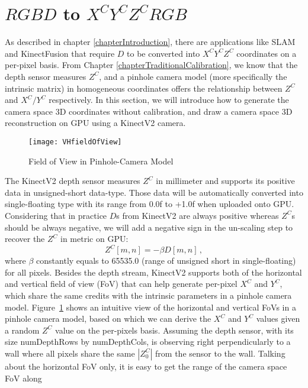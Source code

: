 \section{\(RGBD\) to \(X^CY^CZ^CRGB\)}
\label{sectionCameraSpaceReconstruction}
As described in chapter \ref{chapterIntroduction}, there are applications like SLAM and KinectFusion that require \(D\) to be converted into \(X^CY^CZ^C\) coordinates on a per-pixel basis. From Chapter \ref{chapterTraditionalCalibration}, we know that the depth sensor measures \(Z^C\), and a pinhole camera model (more specifically the intrinsic matrix) in homogeneous coordinates offers the relationship between \(Z^C\) and \(X^C/Y^C\) respectively. In this section, we will introduce how to generate the camera space 3D coordinates without calibration, and draw a camera space 3D reconstruction on GPU using a KinectV2 camera.
\\\indent
%
\begin{figure}[!b]
\centering
\texttt{[image: VHfieldOfView]}
\caption{Field of View in Pinhole-Camera Model}
\label{VHfieldOfView}
\end{figure}%
%
The KinectV2 depth sensor measures \(Z^C\) in millimeter and supports its positive data in unsigned-short data-type. Those data will be automatically converted into single-floating type with its range from 0.0f to +1.0f when uploaded onto GPU. Considering that in practice \(D\)s from KinectV2 are always positive whereas \(Z^C\)s should be always negative, we will add a negative sign in the un-scaling step to recover the \(Z^C\) in metric on GPU:
\begin{equation}
Z^C[m, n] = - \beta D[m, n] \, ,
\label{unscalingZc}
\end{equation}%
\noindent
where \(\beta\) constantly equals to 65535.0 (range of unsigned short in single-floating) for all pixels. Besides the depth stream, KinectV2 supports both of the horizontal and vertical field of view (FoV) that can help generate per-pixel \(X^C\) and \(Y^C\), which share the same credits with the intrinsic parameters in a pinhole camera model. Figure~\ref{VHfieldOfView} shows an intuitive view of the horizontal and vertical FoVs in a pinhole camera model, based on which we can derive the \(X^C\) and \(Y^C\) values given a random \(Z^C\) value on the per-pixels basis. Assuming the depth sensor, with its size numDepthRows by numDepthCols, is observing right perpendicularly to a wall where all pixels share the same \(|Z^C_0|\) from the sensor to the wall. Talking about the horizontal FoV only, it is easy to get the range of the camera space FoV along 
